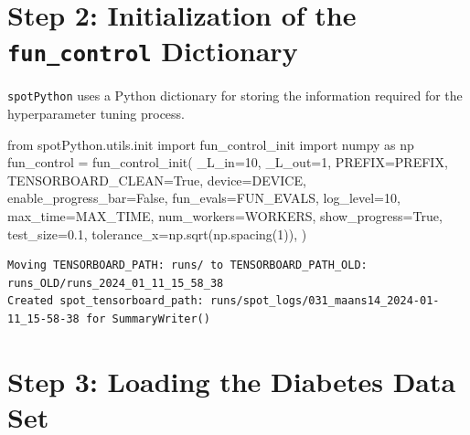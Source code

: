 \documentclass[
  letterpaper,
  DIV=11,
  numbers=noendperiod]{scrreprt}
\newenvironment{Shaded}{\begin{snugshade}}{\end{snugshade}}
\newcommand{\DecValTok}[1]{\textcolor[rgb]{0.68,0.00,0.00}{#1}}
\newcommand{\FloatTok}[1]{\textcolor[rgb]{0.68,0.00,0.00}{#1}}
\newcommand{\ImportTok}[1]{\textcolor[rgb]{0.00,0.46,0.62}{#1}}
\newcommand{\NormalTok}[1]{\textcolor[rgb]{0.00,0.23,0.31}{#1}}
\newcommand{\OperatorTok}[1]{\textcolor[rgb]{0.37,0.37,0.37}{#1}}
\newcommand{\VariableTok}[1]{\textcolor[rgb]{0.07,0.07,0.07}{#1}}
\begin{document}
\section{\texorpdfstring{Step 2: Initialization of the
\texttt{fun\_control}
Dictionary}{Step 2: Initialization of the fun\_control Dictionary}}\label{step-2-initialization-of-the-fun_control-dictionary}

\texttt{spotPython} uses a Python dictionary for storing the information
required for the hyperparameter tuning process.

\begin{Shaded}
\begin{Highlighting}[]
\ImportTok{from}\NormalTok{ spotPython.utils.init }\ImportTok{import}\NormalTok{ fun\_control\_init}
\ImportTok{import}\NormalTok{ numpy }\ImportTok{as}\NormalTok{ np}
\NormalTok{fun\_control }\OperatorTok{=}\NormalTok{ fun\_control\_init(}
\NormalTok{    \_L\_in}\OperatorTok{=}\DecValTok{10}\NormalTok{,}
\NormalTok{    \_L\_out}\OperatorTok{=}\DecValTok{1}\NormalTok{,}
\NormalTok{    PREFIX}\OperatorTok{=}\NormalTok{PREFIX,}
\NormalTok{    TENSORBOARD\_CLEAN}\OperatorTok{=}\VariableTok{True}\NormalTok{,}
\NormalTok{    device}\OperatorTok{=}\NormalTok{DEVICE,}
\NormalTok{    enable\_progress\_bar}\OperatorTok{=}\VariableTok{False}\NormalTok{,}
\NormalTok{    fun\_evals}\OperatorTok{=}\NormalTok{FUN\_EVALS,}
\NormalTok{    log\_level}\OperatorTok{=}\DecValTok{10}\NormalTok{,}
\NormalTok{    max\_time}\OperatorTok{=}\NormalTok{MAX\_TIME,}
\NormalTok{    num\_workers}\OperatorTok{=}\NormalTok{WORKERS,}
\NormalTok{    show\_progress}\OperatorTok{=}\VariableTok{True}\NormalTok{,}
\NormalTok{    test\_size}\OperatorTok{=}\FloatTok{0.1}\NormalTok{,}
\NormalTok{    tolerance\_x}\OperatorTok{=}\NormalTok{np.sqrt(np.spacing(}\DecValTok{1}\NormalTok{)),}
\NormalTok{    )}
\end{Highlighting}
\end{Shaded}

\begin{verbatim}
Moving TENSORBOARD_PATH: runs/ to TENSORBOARD_PATH_OLD: runs_OLD/runs_2024_01_11_15_58_38
Created spot_tensorboard_path: runs/spot_logs/031_maans14_2024-01-11_15-58-38 for SummaryWriter()
\end{verbatim}

\section{Step 3: Loading the Diabetes Data
Set}\label{step-3-loading-the-diabetes-data-set}
\end{document}
